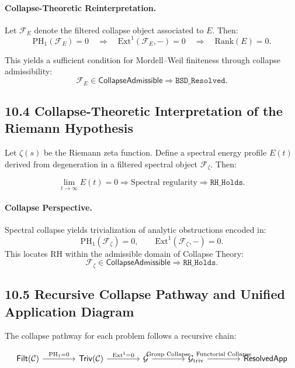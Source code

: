 \documentclass[11pt]{article}
\begin{document}
\paragraph{Collapse-Theoretic Reinterpretation.}
Let \( \mathcal{F}_E \) denote the filtered collapse object associated to \( E \). Then:
\[
\mathrm{PH}_1(\mathcal{F}_E) = 0 \quad \Rightarrow \quad \mathrm{Ext}^1(\mathcal{F}_E, -) = 0 \quad \Rightarrow \quad \mathrm{Rank}(E) = 0.
\]

This yields a sufficient condition for Mordell–Weil finiteness through collapse admissibility:
\[
\mathcal{F}_E \in \mathsf{CollapseAdmissible} \Rightarrow \texttt{BSD\_Resolved}.
\]

\subsection*{10.4 Collapse-Theoretic Interpretation of the Riemann Hypothesis}

Let \( \zeta(s) \) be the Riemann zeta function. Define a spectral energy profile \( E(t) \) derived from degeneration in a filtered spectral object \( \mathcal{F}_\zeta \). Then:

\[
\lim_{t \to \infty} E(t) = 0 \Rightarrow \text{Spectral regularity} \Rightarrow \texttt{RH\_Holds}.
\]

\paragraph{Collapse Perspective.}
Spectral collapse yields trivialization of analytic obstructions encoded in:
\[
\mathrm{PH}_1(\mathcal{F}_\zeta) = 0, \qquad \mathrm{Ext}^1(\mathcal{F}_\zeta, -) = 0.
\]
This locates RH within the admissible domain of Collapse Theory:
\[
\mathcal{F}_\zeta \in \mathsf{CollapseAdmissible} \Rightarrow \texttt{RH\_Holds}.
\]

\subsection*{10.5 Recursive Collapse Pathway and Unified Application Diagram}

The collapse pathway for each problem follows a recursive chain:

\[
\begin{tikzcd}[column sep=4em]
\mathsf{Filt}(\mathcal{C}) \arrow[r, "\mathrm{PH}_1 = 0"]
& \mathsf{Triv}(\mathcal{C}) \arrow[r, "\mathrm{Ext}^1 = 0"]
& \mathcal{G} \arrow[r, "\text{Group Collapse}"]
& \mathcal{G}_{\mathrm{triv}} \arrow[r, "\text{Functorial Collapse}"]
& \mathsf{ResolvedApp}
\end{tikzcd}
\]
\end{document}
